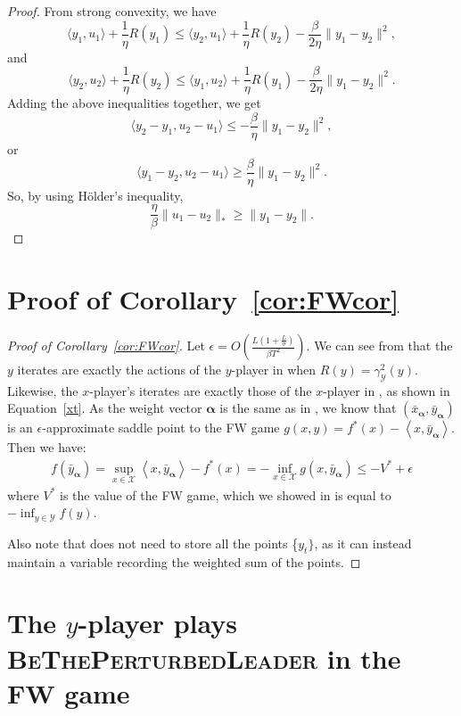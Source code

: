 \documentclass[final,12pt]{colt2018} %
\def\balpha{\boldsymbol{\alpha}}
\def\BTPL{\textsc{BeThePerturbedLeader}\xspace}
\newcommand{\lr}[2]{\left\langle#1,#2\right\rangle}
\newcommand{\XX}{\mathcal{X}}
\newcommand{\YY}{\mathcal{Y}}
\newcommand{\pr}[1]{\left(#1\right)}
\begin{document}
\begin{proof}
From strong convexity, we have
$$ \langle y_1, u_1 \rangle + \frac{1}{\eta} R(y_1)
\leq \langle y_2, u_1 \rangle + \frac{1}{\eta} R(y_2) - \frac{\beta}{2 \eta} \| y_1 - y_2\|^2,$$
and
$$ \langle y_2, u_2 \rangle + \frac{1}{\eta} R(y_2)
\leq \langle y_1, u_2 \rangle + \frac{1}{\eta} R(y_1) - \frac{\beta}{2 \eta} \| y_1 - y_2\|^2.$$
Adding the above inequalities together,
we get 
$$\langle y_2 - y_1, u_2 - u_1 \rangle \leq - \frac{\beta}{\eta} \| y_1 - y_2\|^2,$$ 
or
$$\langle y_1 - y_2, u_2 - u_1 \rangle \geq \frac{\beta}{\eta} \| y_1 - y_2\|^2.$$
So, by using H\"older's inequality,
$$  \frac{\eta}{\beta} \|  u_1 - u_2\|_* \geq \| y_1 - y_2 \|.$$
\end{proof}

\section{Proof of Corollary~\ref{cor:FWcor}}\label{app:fwcor}
\begin{proof}[Proof of Corollary~\ref{cor:FWcor}]
	Let $\epsilon = O\pr{ \frac{ L(1+\frac{L}{\sigma}) }{\beta  T^2}}$. We can see from  that the $y$ iterates are exactly the actions of the $y$-player in  when $R(y) = \gamma_{\YY}^2(y)$. Likewise, the $x$-player's iterates are exactly those of the $x$-player in , as shown in Equation~\ref{xt}. As the weight vector $\balpha$ is the same as in , we know that $(\bar{x}_{\balpha},\bar{y}_{\balpha})$ is an $\epsilon$-approximate saddle point to the FW game $g(x,y) = f^*(x) - \lr{x}{\bar{y}_{\balpha}}$. Then we have:
	\begin{align*}
	f(\bar{y}_{\balpha}) = \sup_{x\in \XX} \lr{x}{\bar{y}_{\balpha}} - f^*(x) = -\inf_{x\in\XX} g(x,\bar{y}_{\balpha}) \le -V^* + \epsilon 
	\end{align*}
	where $V^*$ is the value of the FW game, which we showed in  is equal to $-\inf_{y\in \YY} f(y)$.
	
	Also note that  does not need to store all the points \{$y_{t}\}$, as it can instead maintain a variable recording the weighted sum of the points.	
\end{proof}



\section{The $y$-player plays \BTPL in the FW game} \label{app:BTPL}
\end{document}
